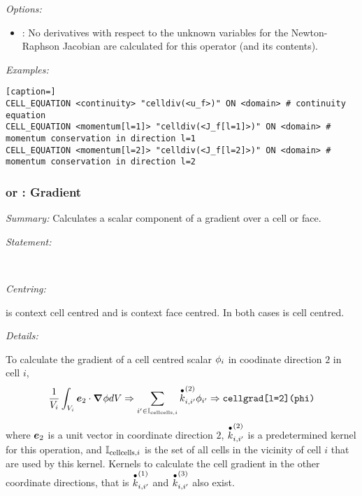 \emph{Options:}
%
\begin{itemize}
\item {}:  No derivatives with respect to the unknown variables for the Newton-Raphson Jacobian are calculated for this operator (and its contents).
\end{itemize}

\emph{Examples:}

\begin{lstlisting}[caption=]
CELL_EQUATION <continuity> "celldiv(<u_f>)" ON <domain> # continuity equation
CELL_EQUATION <momentum[l=1]> "celldiv(<J_f[l=1]>)" ON <domain> # momentum conservation in direction l=1
CELL_EQUATION <momentum[l=2]> "celldiv(<J_f[l=2]>)" ON <domain> # momentum conservation in direction l=2
\end{lstlisting}

\subsubsection{ or : Gradient}


\emph{Summary:} Calculates a scalar component of a gradient over a cell or face.

\emph{Statement:}

 \\

\emph{Centring:}

 is context cell centred and  is context face centred.  In both cases  is cell centred.

\emph{Details:}

To calculate the gradient of a cell centred scalar $\scali[i]{\phi}$ in coodinate direction $2$ in cell $i$,
%
\begin{equation}
\frac{1}{\scali[i]{V}} \int_{\scali[i]{V}} \vecti[2]{e} \cdot \vect{\nabla} \phi dV \Rightarrow \sum_{i' \in \scali[\text{cellcells},i]{\mathbb{I}}} \scali[i,i']{\cellcentred{k}^{(2)}} \scali[i']{\phi} \Rightarrow \code{cellgrad[l=2](phi)} \nonumber
\end{equation}
%
where $\vecti[2]{e}$ is a unit vector in coordinate direction $2$, $\scali[i,i']{\cellcentred{k}^{(2)}}$ is a predetermined kernel for this operation, and  $\scali[\text{cellcells},i]{\mathbb{I}}$ is the set of all cells in the vicinity of cell $i$ that are used by this kernel.  Kernels to calculate the cell gradient in the other coordinate directions, that is $\scali[i,i']{\cellcentred{k}^{(1)}}$ and $\scali[i,i']{\cellcentred{k}^{(3)}}$ also exist.

